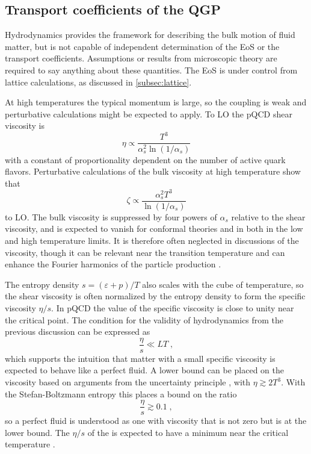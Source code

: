 \subsection{Transport coefficients of the QGP} %

Hydrodynamics provides the framework for describing the bulk motion of fluid matter, but is not capable of independent determination of the \ac{EoS} or the transport coefficients.
Assumptions or results from microscopic theory are required to say anything about these quantities.
The \qcd \ac{EoS} is under control from lattice calculations, as discussed in \cref{subsec:lattice}. %

At high temperatures the typical momentum is large, so the coupling is weak and perturbative calculations might be expected to apply.
To \ac{LO} the \ac{pQCD} shear viscosity is \cite{Arnold:2000dr}
\begin{equation}
\eta \propto \frac{T^3}{\alpha_s^2 \ln \left( 1/\alpha_s\right) }
\end{equation}
with a constant of proportionality dependent on the number of active quark flavors.
Perturbative calculations of the bulk viscosity at high temperature show that \cite{Arnold:2006fz}
\begin{equation}
\zeta \propto \frac{\alpha_s^2 T^3}{\ln \left(1/\alpha_s\right)}
\end{equation}
to \ac{LO}.
The bulk viscosity is suppressed by four powers of $\alpha_s$ relative to the shear viscosity, and is expected to vanish for conformal theories and in both in the low and high temperature limits.
It is therefore often neglected in discussions of the \qgp viscosity, though it can be relevant near the transition temperature and can enhance the Fourier harmonics of the particle production \cite{Noronha-Hostler:2013gga}.

The entropy density $s = (\varepsilon + p)/T$ also scales with the cube of temperature, so the shear viscosity is often normalized by the entropy density to form the specific viscosity $\eta/s$.
In \ac{pQCD} the value of the specific viscosity is close to unity near the critical point.
The condition for the validity of hydrodynamics from the previous discussion can be expressed as
\begin{equation}
  \frac{\eta}{s} \ll LT \;,
\end{equation}
which supports the intuition that matter with a small specific viscosity is expected to behave like a perfect fluid.
A lower bound can be placed on the viscosity based on arguments from the uncertainty principle \cite{Danielewicz:1984ww}, with $\eta \gtrsim 2T^3$.
With the Stefan-Boltzmann entropy this places a bound on the ratio
\begin{equation}
  \label{eq:eta_over_s_uncertainty}
  \frac{\eta}{s} \gtrsim 0.1 \; ,
\end{equation}
so a perfect fluid is understood as one with viscosity that is not zero but is at the lower bound.
The $\eta/s$ of the \qgp is expected to have a minimum near the critical temperature \cite{Csernai:2006zz}.

